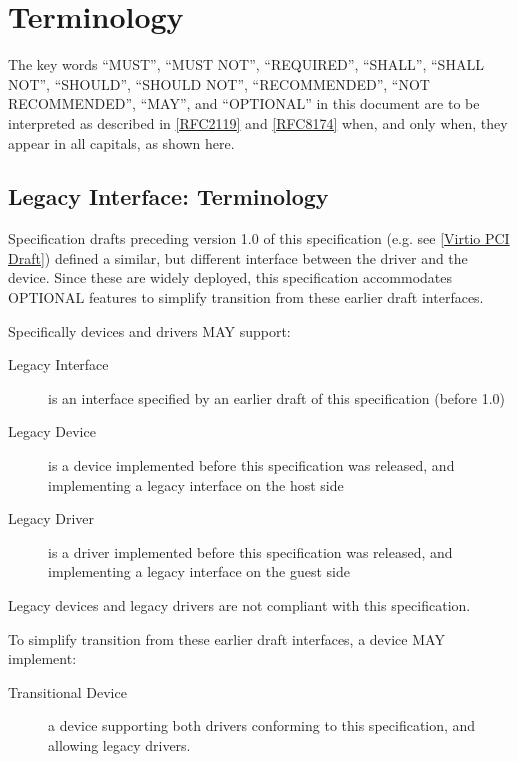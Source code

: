 \section{Terminology}\label{Terminology}

The key words ``MUST'', ``MUST NOT'', ``REQUIRED'', ``SHALL'', ``SHALL NOT'',
``SHOULD'', ``SHOULD NOT'', ``RECOMMENDED'', ``NOT RECOMMENDED'', ``MAY'', and
``OPTIONAL'' in this document are to be interpreted as described in
\hyperref[intro:rfc2119]{[RFC2119]} and \hyperref[intro:rfc8174]{[RFC8174]} when,
and only when, they appear in all capitals, as shown here.
\subsection{Legacy Interface: Terminology}\label{intro:Legacy
Interface: Terminology}

Specification drafts preceding version 1.0 of this specification
(e.g. see \hyperref[intro:Virtio PCI Draft]{[Virtio PCI Draft]})
defined a similar, but different
interface between the driver and the device.
Since these are widely deployed, this specification
accommodates OPTIONAL features to simplify transition
from these earlier draft interfaces.

Specifically devices and drivers MAY support:
\begin{description}
\item[Legacy Interface]
        is an interface specified by an earlier draft of this specification
        (before 1.0)
\item[Legacy Device]
        is a device implemented before this specification was released,
        and implementing a legacy interface on the host side
\item[Legacy Driver]
        is a driver implemented before this specification was released,
        and implementing a legacy interface on the guest side
\end{description}

Legacy devices and legacy drivers are not compliant with this
specification.

To simplify transition from these earlier draft interfaces,
a device MAY implement:

\begin{description}
\item[Transitional Device]
        a device supporting both drivers conforming to this
        specification, and allowing legacy drivers.
\end{description}

